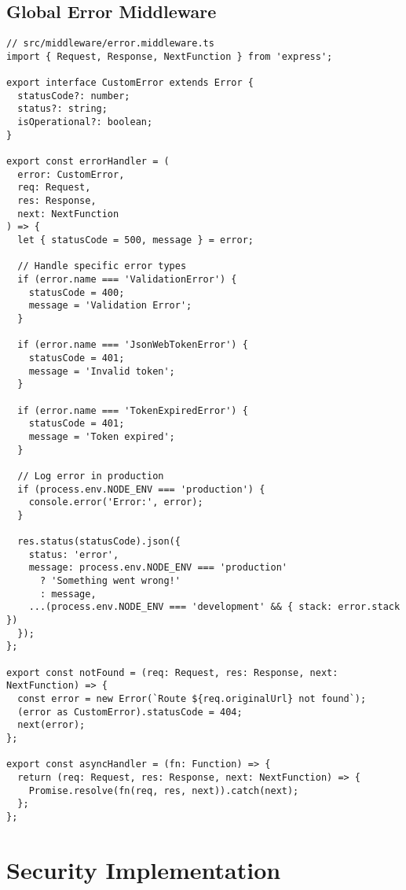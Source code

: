 \documentclass[12pt,a4paper]{article}
\begin{document}
\subsection{Global Error Middleware}
\begin{lstlisting}[caption=Global Error Handler]
// src/middleware/error.middleware.ts
import { Request, Response, NextFunction } from 'express';

export interface CustomError extends Error {
  statusCode?: number;
  status?: string;
  isOperational?: boolean;
}

export const errorHandler = (
  error: CustomError,
  req: Request,
  res: Response,
  next: NextFunction
) => {
  let { statusCode = 500, message } = error;

  // Handle specific error types
  if (error.name === 'ValidationError') {
    statusCode = 400;
    message = 'Validation Error';
  }

  if (error.name === 'JsonWebTokenError') {
    statusCode = 401;
    message = 'Invalid token';
  }

  if (error.name === 'TokenExpiredError') {
    statusCode = 401;
    message = 'Token expired';
  }

  // Log error in production
  if (process.env.NODE_ENV === 'production') {
    console.error('Error:', error);
  }

  res.status(statusCode).json({
    status: 'error',
    message: process.env.NODE_ENV === 'production' 
      ? 'Something went wrong!' 
      : message,
    ...(process.env.NODE_ENV === 'development' && { stack: error.stack })
  });
};

export const notFound = (req: Request, res: Response, next: NextFunction) => {
  const error = new Error(`Route ${req.originalUrl} not found`);
  (error as CustomError).statusCode = 404;
  next(error);
};

export const asyncHandler = (fn: Function) => {
  return (req: Request, res: Response, next: NextFunction) => {
    Promise.resolve(fn(req, res, next)).catch(next);
  };
};
\end{lstlisting}

\section{Security Implementation}
\end{document}
